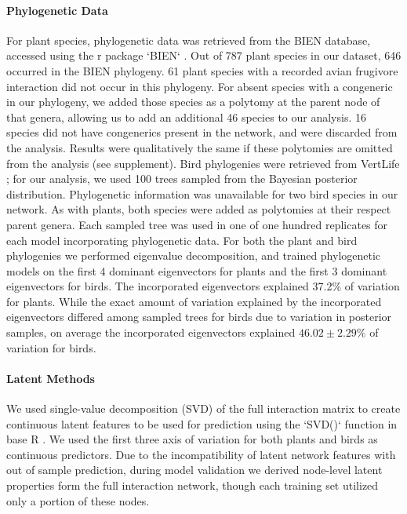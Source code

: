 \paragraph{Phylogenetic Data}
For plant species, phylogenetic data was retrieved from the BIEN database, accessed using the r package `BIEN` \cite{maitner2018bien}. Out of 787 plant species in our dataset, 646 occurred in the BIEN phylogeny. 61 plant species with a recorded avian frugivore interaction did not occur in this phylogeny. For absent species with a congeneric in our phylogeny, we added those species as a polytomy at the parent node of that genera, allowing us to add an additional 46 species to our analysis. 16 species did not have congenerics present in the network, and were discarded from the analysis. Results were qualitatively the same if these polytomies are omitted from the analysis (see supplement). Bird phylogenies were retrieved from VertLife \cite{jetz2012}; for our analysis, we used 100 trees sampled from the Bayesian posterior distribution. Phylogenetic information was unavailable for two bird species in our network. As with plants, both species were added as polytomies at their respect parent genera. Each sampled tree was used in one of one hundred replicates for each model incorporating phylogenetic data. For both the plant and bird phylogenies we performed eigenvalue decomposition, and trained phylogenetic models on the first 4 dominant eigenvectors for plants and the first 3 dominant eigenvectors for birds. The incorporated eigenvectors explained 37.2\% of variation for plants. While the exact amount of variation explained by the incorporated eigenvectors differed among sampled trees for birds due to variation in posterior samples, on average the incorporated eigenvectors explained $46.02\pm 2.29\%$ of variation for birds. 


\paragraph{Latent Methods} We used single-value decomposition (SVD) of the full interaction matrix to create continuous latent features to be used for prediction using the `SVD()` function in base R \cite{RCore}. We used the first three axis of variation for both plants and birds as continuous predictors. Due to the incompatibility of latent network features with out of sample prediction, during model validation we derived node-level latent properties form the full interaction network, though each training set utilized only a portion of these nodes. 


